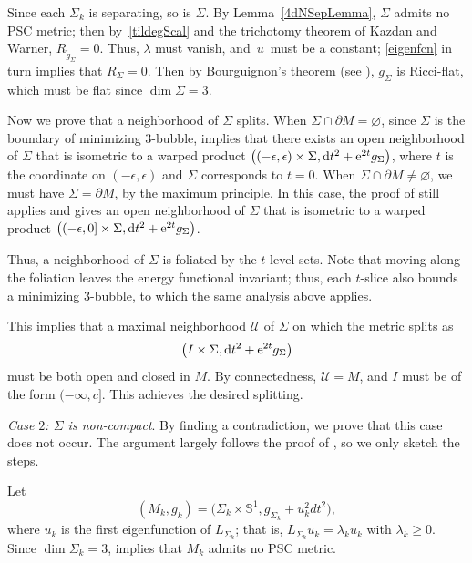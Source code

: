 \documentclass[10pt,a4paper]{amsart}
\numberwithin{equation}{section}
\def\S{\mathbb{S}}
\def\Ucal{\mathcal{U}}
\def\ed{{\rm d}}
\begin{document}
Since each $\Sigma_k$ is separating, so is $\Sigma$. By Lemma~\ref{4dNSepLemma},
 $\Sigma$ admits no PSC metric; then by~\eqref{tildegScal} and
 the trichotomy theorem of Kazdan and Warner,
 $R_{\tilde g_\Sigma}= 0$. Thus,  $\lambda$ must vanish, and~$u$~must be a constant; \eqref{eigenfcn} in turn implies that $R_{\Sigma}=0$. %
Then by Bourguignon's theorem (see \cite[Lemma 5.2]{KW75}),
$g_\Sigma$ is Ricci-flat, which must be flat since $\dim \Sigma=3$.

Now we prove that a neighborhood of $\Sigma$ splits.
When $\Sigma\cap\partial M = \varnothing$, since $\Sigma$ is the boundary of minimizing $3$-bubble,
\cite[Theorem 2.3]{ACG08} implies that  there exists an open neighborhood of $\Sigma$ that is isometric to a warped product $\bigl((-\epsilon,\epsilon)\times\Sigma, \ed t^{2}+{\rm e}^{2t}g_{\Sigma}\bigr)$, where $t$ is the coordinate on $(-\epsilon,\epsilon)$ and $\Sigma$ corresponds to $t = 0$.  When $\Sigma\cap\partial M\ne \varnothing$, we must have $\Sigma = \partial M$, by the maximum principle.
In this case, the proof of \cite[Theorem 2.3]{ACG08} still applies and gives an open neighborhood of $\Sigma$ that is isometric to a warped product $\bigl((-\epsilon,0]\times\Sigma, \ed t^{2}+{\rm e}^{2t}g_{\Sigma}\bigr)$.

Thus, a neighborhood of $\Sigma$ is foliated by the $t$-level sets. Note that moving along the foliation leaves the energy functional invariant; thus, each $t$-slice also bounds a minimizing $3$-bubble, to which the same analysis above applies.

This implies that a maximal neighborhood $\Ucal$ of $\Sigma$ on which the metric splits as
\[
	\bigl(I\times\Sigma, \ed t^{2}+{\rm e}^{2t}g_{\Sigma}\bigr)
\]  must be both
open and closed in $M$. By connectedness, $\Ucal = M$, and $I$ must be of the form $(-\infty, c]$.
This achieves the desired splitting.

\emph{Case $2$: $\Sigma$ is non-compact}. By finding a contradiction, we prove that this case does not occur. The argument largely follows the proof of \cite[Theorem 1.1]{Zhu2020}, so we only sketch the steps.

Let
\[
	\left(M_k, g_k\right)=\bigl(\Sigma_{k}\times \S^{1}, g_{\Sigma_{k}}+u_{k}^{2}dt^{2}\bigr),
\]	
where $u_{k}$ is the first eigenfunction of $L_{\Sigma_{k}}$; that is, $L_{\Sigma_{k}}u_{k}=\lambda_{k}u_k$ with $\lambda_{k}\geq 0$.
Since $\dim \Sigma_k = 3$,  \cite[Corollary 1.10]{CRZ2022} implies that $M_k$ admits no PSC metric.
\end{document}
